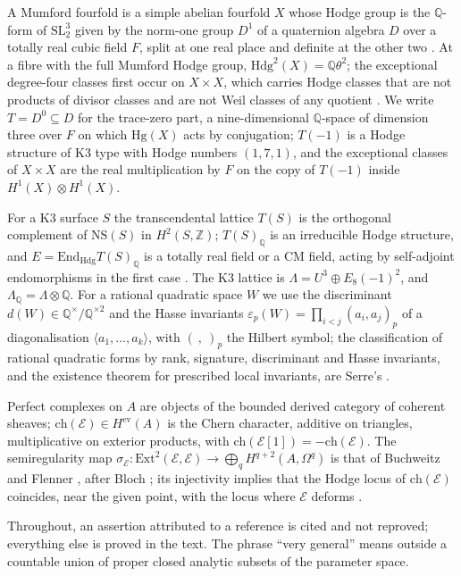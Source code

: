 \documentclass[11pt,reqno]{amsart}
\numberwithin{equation}{section}
\theoremstyle{plain}
\theoremstyle{definition}
\newcommand{\QQ}{\mathbb{Q}}
\newcommand{\ZZ}{\mathbb{Z}}
\newcommand{\Hdg}{\mathrm{Hdg}}
\newcommand{\Hg}{\mathrm{Hg}}
\newcommand{\NS}{\mathrm{NS}}
\newcommand{\Ext}{\mathrm{Ext}}
\newcommand{\End}{\mathrm{End}}
\newcommand{\ch}{\mathrm{ch}}
\begin{document}
A Mumford fourfold is a simple abelian fourfold $X$ whose Hodge group is the $\QQ$-form of $\mathrm{SL}_{2}^{3}$ given by the norm-one group $D^{1}$ of a quaternion algebra $D$ over a totally real cubic field $F$, split at one real place and definite at the other two \cite{Mum69}. At a fibre with the full Mumford Hodge group, $\Hdg^{2}(X)=\QQ\theta^{2}$; the exceptional degree-four classes first occur on $X\times X$, which carries Hodge classes that are not products of divisor classes and are not Weil classes of any quotient \cite{MZ95,BMB26}. We write $T=D^{0}\subseteq D$ for the trace-zero part, a nine-dimensional $\QQ$-space of dimension three over $F$ on which $\Hg(X)$ acts by conjugation; $T(-1)$ is a Hodge structure of K3 type with Hodge numbers $(1,7,1)$, and the exceptional classes of $X\times X$ are the real multiplication by $F$ on the copy of $T(-1)$ inside $H^{1}(X)\otimes H^{1}(X)$.

For a K3 surface $S$ the transcendental lattice $T(S)$ is the orthogonal complement of $\NS(S)$ in $H^{2}(S,\ZZ)$; $T(S)_{\QQ}$ is an irreducible Hodge structure, and $E=\End_{\Hdg}T(S)_{\QQ}$ is a totally real field or a CM field, acting by self-adjoint endomorphisms in the first case \cite{Zar83}. The K3 lattice is $\Lambda=U^{3}\oplus E_{8}(-1)^{2}$, and $\Lambda_{\QQ}=\Lambda\otimes\QQ$. For a rational quadratic space $W$ we use the discriminant $d(W)\in\QQ^{\times}/\QQ^{\times2}$ and the Hasse invariants $\varepsilon_{p}(W)=\prod_{i<j}(a_{i},a_{j})_{p}$ of a diagonalisation $\langle a_{1},\dots,a_{k}\rangle$, with $(\ ,\ )_{p}$ the Hilbert symbol; the classification of rational quadratic forms by rank, signature, discriminant and Hasse invariants, and the existence theorem for prescribed local invariants, are Serre's \cite[Chap.~IV]{Ser73}.

Perfect complexes on $A$ are objects of the bounded derived category of coherent sheaves; $\ch(\mathcal{E})\in H^{\mathrm{ev}}(A)$ is the Chern character, additive on triangles, multiplicative on exterior products, with $\ch(\mathcal{E}[1])=-\ch(\mathcal{E})$. The semiregularity map $\sigma_{\mathcal{E}}\colon\Ext^{2}(\mathcal{E},\mathcal{E})\to\bigoplus_{q}H^{q+2}(A,\Omega^{q})$ is that of Buchweitz and Flenner \cite{BF03}, after Bloch \cite{Blo72}; its injectivity implies that the Hodge locus of $\ch(\mathcal{E})$ coincides, near the given point, with the locus where $\mathcal{E}$ deforms \cite{BF03,Pri24}.

Throughout, an assertion attributed to a reference is cited and not reproved; everything else is proved in the text. The phrase ``very general'' means outside a countable union of proper closed analytic subsets of the parameter space.
\end{document}
